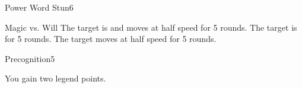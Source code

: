 \begin{spellsection}{Power Word Stun}{6}
    \begin{spellheader}
    \end{spellheader}
    \begin{spellcontent}
        \begin{spelltargetinginfo}
        \end{spelltargetinginfo}
        \begin{spelleffects}
            \begin{spellattack}{Magic vs. Will}
                \spellsuccess The target is \dazed and moves at half speed for 5 rounds.
                \spellcritical The target is \stunned for 5 rounds.
                \spellfailure The target moves at half speed for 5 rounds.
            \end{spellattack}
        \end{spelleffects}
    \end{spellcontent}
    \begin{spellfooter}
        \miscastrandom
    \end{spellfooter}
\end{spellsection}

\begin{spellsection}{Precognition}{5}
    \begin{spellheader}
    \end{spellheader}
    \begin{spellcontent}
        \begin{spelltargetinginfo}
        \end{spelltargetinginfo}
        \begin{spelleffects}
            \spelleffect You gain two legend points.
            \spelldur \durshort \dismissable
        \end{spelleffects}
    \end{spellcontent}
    \begin{spellfooter}
        \miscastexplode
    \end{spellfooter}
\end{spellsection}


